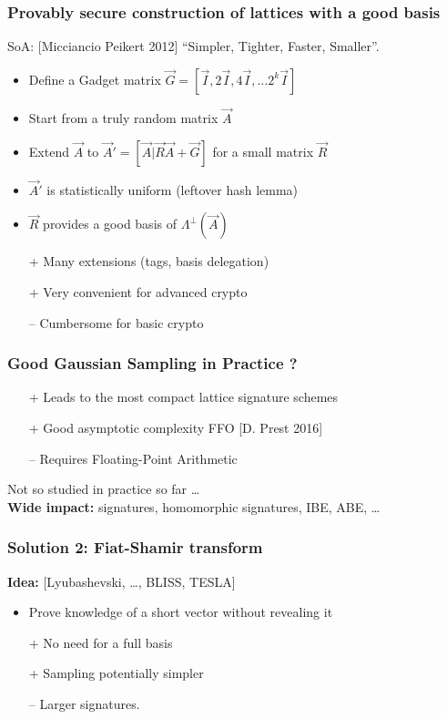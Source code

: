 \begin{frame}
\frametitle{Provably secure construction of lattices with a good basis}
SoA: [Micciancio Peikert 2012] ``Simpler, Tighter, Faster, Smaller''.
\begin{itemize}
  \item Define a Gadget matrix $\vec G = [\vec I, 2\vec I, 4\vec I, \dots 2^k \vec I]$
  \item Start from a truly random matrix $\vec A$
  \item Extend $\vec A$ to $\vec A' = [\vec A | \vec R \vec A + \vec G]$ for a small matrix $\vec R$
  \item $\vec A'$ is statistically uniform {\hfill \small (leftover hash lemma)}
  \item $\vec R$ provides a good basis of $\Lambda^\bot(\vec A)$
\end{itemize}

\begin{itemize}
\item[+] Many extensions (tags, basis delegation)
\item[+] Very convenient for advanced crypto
\item[--] Cumbersome for basic crypto
\end{itemize}

\end{frame}

\begin{frame}
\frametitle{Good Gaussian Sampling in Practice ?}
\begin{itemize}
  \item[+] Leads to the most compact lattice signature schemes
  \item[+] Good asymptotic complexity \hfill{\scriptsize FFO [D. Prest 2016]}
  \item[--] Requires Floating-Point Arithmetic
\end{itemize}
\vspace{.5cm}
\pause
Not so studied in practice so far \dots \\
{\bf Wide impact:} signatures, homomorphic signatures, IBE, ABE, \dots

\end{frame}

\begin{frame}
\frametitle{Solution 2: Fiat-Shamir transform}

{\bf Idea: } [Lyubashevski, \dots, BLISS, TESLA] 
\begin{itemize}
  \item Prove knowledge of a short vector without revealing it 
\end{itemize}

\begin{itemize}
  \item[+] No need for a full basis
  \item[+] Sampling potentially simpler
  \item[--] Larger signatures.
\end{itemize}
\end{frame}
